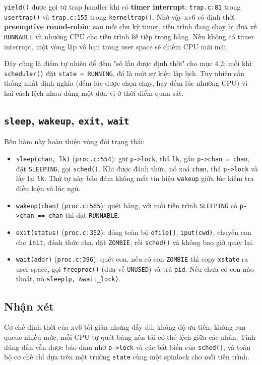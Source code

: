 \texttt{yield()} được gọi từ trap handler khi có \textbf{timer interrupt}: \texttt{trap.c:81} trong \texttt{usertrap()} và \texttt{trap.c:155} trong \texttt{kerneltrap()}. Nhờ vậy xv6 có định thời \textbf{preemptive round-robin}: sau mỗi chu kỳ timer, tiến trình đang chạy bị đưa về \texttt{RUNNABLE} và nhường CPU cho tiến trình kế tiếp trong bảng. Nếu không có timer interrupt, một vòng lặp vô hạn trong user space sẽ chiếm CPU mãi mãi.

Đây cũng là điểm tự nhiên để đếm "số lần được định thời" cho mục 4.2: mỗi khi \texttt{scheduler()} đặt \texttt{state = RUNNING}, đó là một sự kiện lập lịch. Tuy nhiên cần thống nhất định nghĩa (đếm lúc được chọn chạy, hay đếm lúc nhường CPU) vì hai cách lệch nhau đúng một đơn vị ở thời điểm quan sát.

\subsection{\texttt{sleep}, \texttt{wakeup}, \texttt{exit}, \texttt{wait}}

Bốn hàm này hoàn thiện vòng đời trạng thái:

\begin{itemize}[itemsep=0pt, topsep=2.5pt, leftmargin=1.5cm]
    \item \texttt{sleep(chan, lk)} (\texttt{proc.c:554}): giữ \texttt{p->lock}, thả \texttt{lk}, gán \texttt{p->chan = chan}, đặt \texttt{SLEEPING}, gọi \texttt{sched()}. Khi được đánh thức, nó xoá \texttt{chan}, thả \texttt{p->lock} và lấy lại \texttt{lk}. Thứ tự này bảo đảm không mất tín hiệu \texttt{wakeup} giữa lúc kiểm tra điều kiện và lúc ngủ.
    \item \texttt{wakeup(chan)} (\texttt{proc.c:585}): quét bảng, với mỗi tiến trình \texttt{SLEEPING} có \texttt{p->chan == chan} thì đặt \texttt{RUNNABLE}.
    \item \texttt{exit(status)} (\texttt{proc.c:352}): đóng toàn bộ \texttt{ofile[]}, \texttt{iput(cwd)}, chuyển con cho \texttt{init}, đánh thức cha, đặt \texttt{ZOMBIE}, rồi \texttt{sched()} và không bao giờ quay lại.
    \item \texttt{wait(addr)} (\texttt{proc.c:396}): quét con, nếu có con \texttt{ZOMBIE} thì copy \texttt{xstate} ra user space, gọi \texttt{freeproc()} (đưa về \texttt{UNUSED}) và trả \texttt{pid}. Nếu chưa có con nào thoát, nó \texttt{sleep(p, \&wait\_lock)}.
\end{itemize}

\subsection{Nhận xét}

Cơ chế định thời của xv6 tối giản nhưng đầy đủ: không độ ưu tiên, không run queue nhiều mức, mỗi CPU tự quét bảng nên tải có thể lệch giữa các nhân. Tính đúng đắn vẫn được bảo đảm nhờ \texttt{p->lock} và các bất biến của \texttt{sched()}, và toàn bộ cơ chế chỉ dựa trên một trường \texttt{state} cùng một spinlock cho mỗi tiến trình.
